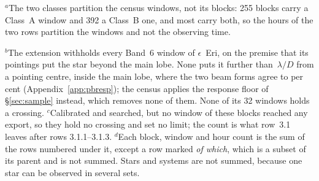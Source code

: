 {\footnotesize\raggedright $^{a}$The two classes partition the census windows, not its blocks: 255 blocks carry a Class~A window and 392 a Class~B one, and most carry both, so the hours of the two rows partition the windows and not the observing time.}

{\footnotesize\raggedright $^{b}$The extension withholds every Band~6 window of $\epsilon$~Eri, on the premise that its pointings put the star beyond the main lobe. None puts it further than \ExCWorstExt\,$\lambda/D$ from a pointing centre, inside the main lobe, where the two beam forms agree to \EdExtAgreePct{} per cent (Appendix~\ref{app:pbresp}); the census applies the response floor of \S\ref{sec:sample} instead, which removes none of them. None of its 32 windows holds a crossing. $^{c}$Calibrated and searched, but no window of these blocks reached any export, so they hold no crossing and set no limit; the count is what row~3.1 leaves after rows 3.1.1--3.1.3. $^{d}$Each block, window and hour count is the sum of the rows numbered under it, except a row marked \emph{of which}, which is a subset of its parent and is not summed. Stars and systems are not summed, because one star can be observed in several sets.}
